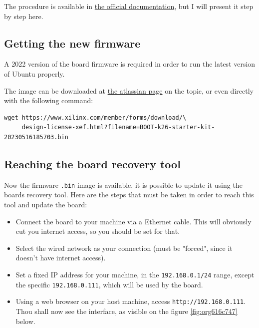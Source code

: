 \documentclass[10pt]{article}
\begin{document}
The procedure is available in \href{https://docs.xilinx.com/r/en-US/ug1089-kv260-starter-kit/Firmware-Update}{the official documentation},
but I will present it step by step here.

\subsection{Getting the new firmware}
\label{sec:orgc835d7d}
A 2022 version of the board firmware is required in order to run the latest
version of Ubuntu properly.

The image can be downloaded at \href{https://xilinx-wiki.atlassian.net/wiki/spaces/A/pages/1641152513/Kria+K26+ SOMoot-FW-update-with-xmutil}{the atlassian page} on the topic,
or even directly with the following command:

\begin{verbatim}
wget https://www.xilinx.com/member/forms/download/\
     design-license-xef.html?filename=BOOT-k26-starter-kit-20230516185703.bin
\end{verbatim}


\subsection{Reaching the board recovery tool}
\label{sec:org76aca8f}
Now the firmware \texttt{.bin} image is available, it is possible to update it using the
boards recovery tool. Here are the steps that must be taken in order to reach
this tool and update the board:

\begin{itemize}
\item Connect the board to your machine via a Ethernet cable.
This will obviously cut you internet access, so you should be set for that.
\item Select the wired network as your connection (must be "forced", since it
doesn't have internet access).
\item Set a fixed IP address for your machine, in the \texttt{192.168.0.1/24}
range, except the specific \texttt{192.168.0.111}, which will be used by the
board.
\item Using a web browser on your host machine, access
\texttt{http://192.168.0.111}. Thou shall now see the interface, as visible on
the figure \ref{fig:org616c747} below.
\end{itemize}
\end{document}
